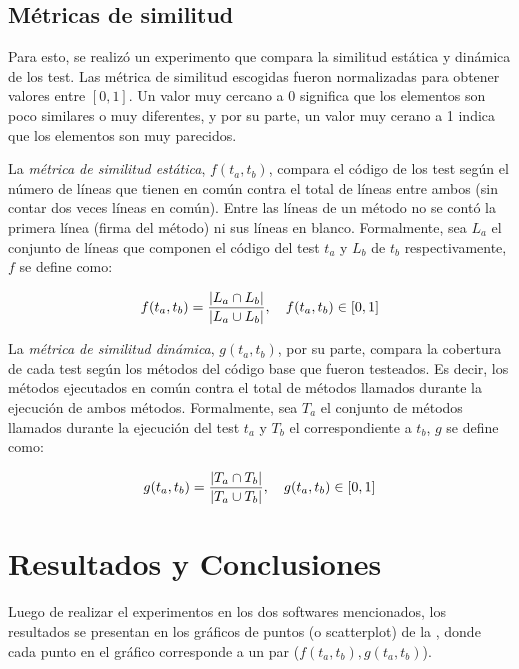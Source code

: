 \subsection{Métricas de similitud}
\par Para esto, se realizó un experimento que compara la similitud estática y dinámica de los test. Las métrica de similitud escogidas fueron normalizadas para obtener valores entre $\left[ 0 , 1 \right]$. Un valor muy cercano a $0$ significa que los elementos son poco similares o muy diferentes, y por su parte, un valor muy cerano a 1 indica que los elementos son muy parecidos. 

\par La \emph{métrica de similitud estática}, $f(t_a,t_b)$, compara el código de los test según el número de líneas que tienen en común contra el total de líneas entre ambos (sin contar dos veces líneas en común). Entre las líneas de un método no se contó la primera línea (firma del método) ni sus líneas en blanco. Formalmente, sea $L_{a}$ el conjunto de líneas que componen el código del test $t_a$ y  $L_{b}$ de $t_b$ respectivamente, $f$ se define como: 

\[ f(t_a,t_b)= \dfrac{\vert L_{a} \cap L_{b} \vert}{\vert L_{a} \cup L_{b} \vert} , \quad f(t_a,t_b) \in \left[ 0 , 1 \right] \]

\par La \emph{métrica de similitud dinámica}, $g(t_a,t_b)$, por su parte, compara la cobertura de cada test según los métodos del código base que fueron testeados. Es decir, los métodos ejecutados en común contra el total de métodos llamados durante la ejecución de ambos métodos. Formalmente, sea $T_{a}$ el conjunto de métodos llamados durante la ejecución del test $t_a$ y $T_{b}$ el correspondiente a $t_b$, $g$ se define como: 

\[ g(t_a,t_b)= \dfrac{\vert T_{a} \cap T_{b} \vert}{\vert T_{a} \cup T_{b} \vert} , \quad g(t_a,t_b) \in \left[ 0 , 1 \right] \]


\section{Resultados y Conclusiones}

\par Luego de realizar el experimentos en los dos softwares mencionados, los resultados se presentan en los gráficos de puntos (o scatterplot) de la , donde cada punto en el gráfico corresponde a un par ($f(t_a,t_b),g(t_a,t_b)$).

